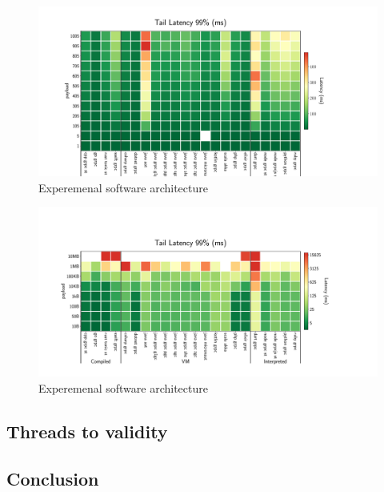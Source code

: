 \begin{figure}[!hbt]
    \begin{center}
        \includegraphics[width=1.2\linewidth]{imgs/rpc_images/tail99_clients}
    \end{center}
    \caption{Experemenal software architecture}\label{fig:tail99_clients}
\end{figure}


\begin{figure}[!hbt]
    \begin{center}
        \includegraphics[width=1.2\linewidth]{imgs/rpc_images/tail99_payload}
    \end{center}
    \caption{Experemenal software architecture}\label{fig:tail99_payload}
\end{figure}


\subsection{Threads to validity}
\subsection{Conclusion}
